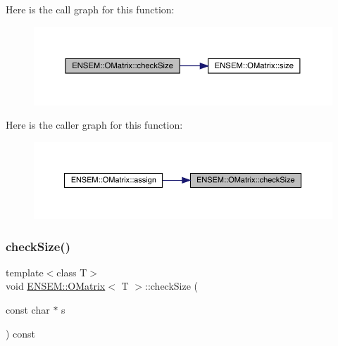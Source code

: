 Here is the call graph for this function\+:
\nopagebreak
\begin{figure}[H]
\begin{center}
\leavevmode
\includegraphics[width=350pt]{dd/d80/classENSEM_1_1OMatrix_abec80929ab7e8e2a23822fbbc841bd87_cgraph}
\end{center}
\end{figure}
Here is the caller graph for this function\+:
\nopagebreak
\begin{figure}[H]
\begin{center}
\leavevmode
\includegraphics[width=350pt]{dd/d80/classENSEM_1_1OMatrix_abec80929ab7e8e2a23822fbbc841bd87_icgraph}
\end{center}
\end{figure}
\mbox{\label{classENSEM_1_1OMatrix_abec80929ab7e8e2a23822fbbc841bd87}} 
\subsubsection{\texorpdfstring{checkSize()}{checkSize()}\hspace{0.1cm}{\footnotesize\ttfamily [3/6]}}
{\footnotesize\ttfamily template$<$class T$>$ \\
void \mbox{\hyperlink{classENSEM_1_1OMatrix}{E\+N\+S\+E\+M\+::\+O\+Matrix}}$<$ T $>$\+::check\+Size (\begin{DoxyParamCaption}\item[{const char $\ast$}]{s }\end{DoxyParamCaption}) const\hspace{0.3cm}{\ttfamily [inline]}}

